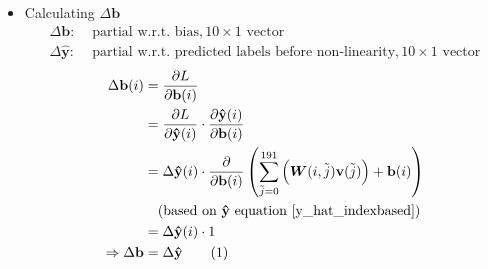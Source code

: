\documentclass[12pt]{article}
\renewcommand{\vec}[1]{\mathbf{#1}}
\newcommand\numberthis{\stepcounter{equation}\tag{\theequation}}
\begin{document}
\begin{itemize}
\item Calculating $\Delta \vec{b}$
\begin{align*}
    \Delta \vec{b}:& \text{ partial w.r.t. bias}, 10 \times 1 \text{ vector}\\
    \Delta{\vec{\hat{y}}}:& \text{ partial w.r.t. predicted labels before non-linearity}, 10 \times 1 \text{ vector}
\end{align*}
\begin{align*}
    \Delta \vec{b}(i)
    &= \frac{\partial{L}}{\partial{\vec{b}(i)}}
    \\
    &= \frac{\partial{L}}{\partial{\vec{\hat{y}}(i)}}
    \cdot
    \frac{\partial{\vec{\hat{y}}(i)}}{\partial{\vec{b}(i)}}
    \\
    &= \Delta{\vec{\hat{y}}}(i)
    \cdot
    \frac{\partial}{\partial{\vec{b}(i)}}\left(\sum_{\Tilde{j} = 0}^{191}\Big(\bm{W}(i, \Tilde{j})\vec{v}(\Tilde{j})\Big) + \vec{b}(i)\right)
    \\
    &\quad (\text{based on $\vec{\hat{y}}$ equation } \eqref{y_hat_indexbased})
    \\
    &= \Delta{\vec{\hat{y}}}(i) \cdot 1
    \\
    \Rightarrow \Delta \vec{b} &= \Delta{\vec{\hat{y}}}
    \numberthis \label{delta_B}
\end{align*}

\end{itemize}
\end{document}
